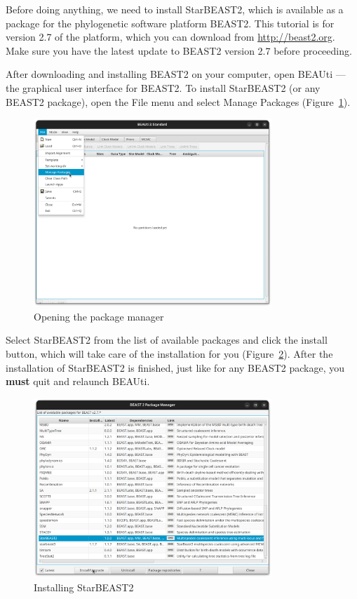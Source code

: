 \documentclass[12pt]{article}
\begin{document}
Before doing anything, we need to install StarBEAST2, which is available as a package for
the phylogenetic software platform BEAST2. This tutorial is for version 2.7 of the platform, which you can download from \url{http://beast2.org}.
Make sure you have the latest update to BEAST2 version 2.7 before proceeding.

After downloading and installing BEAST2 on your computer, open BEAUti ---
the graphical user interface for BEAST2. To install StarBEAST2 (or
any BEAST2 package), open the File menu and select Manage Packages (Figure~\ref{fig:managePackages}).

\begin{figure}[htb!]
\centering
\includegraphics[width=0.8\textwidth]{figures/managePackages.png}
\caption
{Opening the package manager}
\label{fig:managePackages}
\end{figure}

Select StarBEAST2 from the list of available packages and click the install button, which will take
care of the installation for you (Figure~\ref{fig:installStarBEAST2}). After the installation of StarBEAST2 is finished, just like for any BEAST2 package, you
\textbf{must} quit and relaunch BEAUti.

\begin{figure}[htb!]
\centering
\includegraphics[width=0.8\textwidth]{figures/installStarBEAST2.png}
\caption
{Installing StarBEAST2}
\label{fig:installStarBEAST2}
\end{figure}
\end{document}
